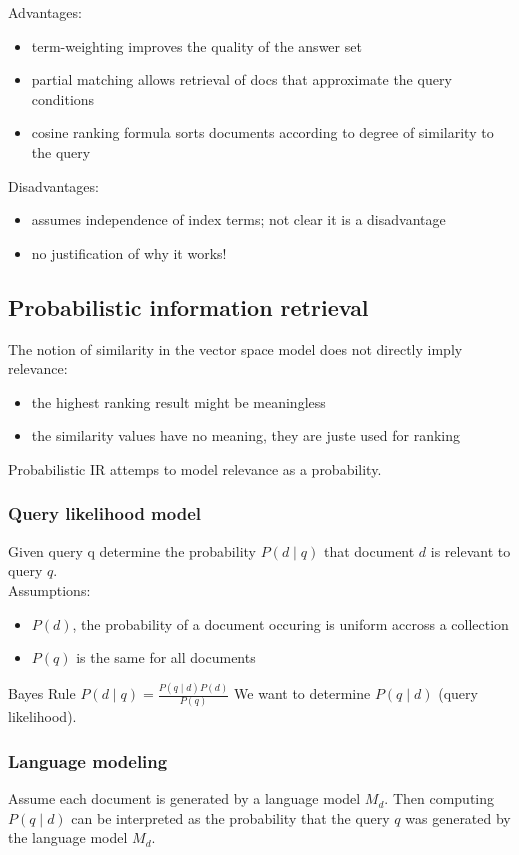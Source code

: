 Advantages:
\begin{itemize}
\item term-weighting improves the quality of the answer set
\item partial matching allows retrieval of docs that approximate the
  query conditions
\item cosine ranking formula sorts documents according to degree of
  similarity to the query
\end{itemize}

Disadvantages:
\begin{itemize}
\item assumes independence of index terms; not clear it is a
  disadvantage
\item no justification of why it works!
\end{itemize}

\subsection{Probabilistic information retrieval}

The notion of similarity in the vector space model does not directly
imply relevance:
\begin{itemize}
\item the highest ranking result might be meaningless
\item the similarity values have no meaning, they are juste used for
  ranking
\end{itemize}
Probabilistic IR attemps to model relevance as a probability.

\subsubsection{Query likelihood model}
Given query q determine the probability $ P(d \mid q) $ that document
$ d $ is relevant to query $ q $.\\
Assumptions:
\begin{itemize}
\item $ P(d) $, the probability of a document occuring is uniform
  accross a collection
\item $ P(q) $ is the same for all documents
\end{itemize}
Bayes Rule $ P(d \mid q) = \frac{P(q \mid d) P(d)}{P(q)} $
We want to determine $ P(q \mid d) $ (query likelihood).

\subsubsection{Language modeling}
Assume each document is generated by a language model $ M_d $.
Then computing $ P(q \mid d) $ can be interpreted as the probability
that the query $ q $ was generated by the language model $ M_d $.

